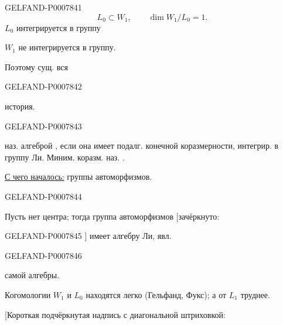 \begin{GelfandAdjacentEvidence}{GELFAND-P000784}{1}
\[
L_0\subset W_1,\qquad \dim W_1/L_0=1.
\]
\(L_0\) интегрируется в группу

\(W_1\) не интегрируется в группу.

Поэтому сущ. вся
\end{GelfandAdjacentEvidence}
\begin{GelfandAdjacentEvidence}{GELFAND-P000784}{2}

история.

\end{GelfandAdjacentEvidence}
\begin{GelfandAdjacentEvidence}{GELFAND-P000784}{3}


 наз. алгеброй , если она
имеет подалг. конечной коразмерности, интегрир. в группу Ли.
Миним. коразм. наз. .

\underline{С чего началось:} группы автоморфизмов.

\end{GelfandAdjacentEvidence}
\begin{GelfandAdjacentEvidence}{GELFAND-P000784}{4}

Пусть нет центра; тогда группа автоморфизмов [зачёркнуто:
\end{GelfandAdjacentEvidence}
\begin{GelfandAdjacentEvidence}{GELFAND-P000784}{5}
]
имеет алгебру Ли, явл.
\end{GelfandAdjacentEvidence}
\begin{GelfandAdjacentEvidence}{GELFAND-P000784}{6}

самой алгебры.

Когомологии \(W_1\) и \(L_0\) находятся легко (Гельфанд, Фукс);
а от \(L_1\) труднее.

[Короткая подчёркнутая надпись с диагональной штриховкой:
\end{GelfandAdjacentEvidence}
